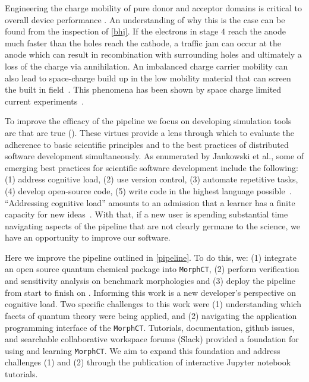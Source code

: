 
Engineering the charge mobility of pure donor and acceptor domains is critical
to overall device performance \cite{Wang2019e}.
An understanding of why this is the case can be found from the inspection of \autoref{bhj}.
If the electrons in stage $4$ reach the anode much faster than the holes reach the cathode, a traffic jam can
occur at the anode which can result in recombination with surrounding holes and ultimately a loss of the
charge via annihilation. 
An imbalanced charge carrier mobility can also lead to space-charge build up in the 
low mobility material that can screen the built in field~\cite{Bartelt2015}.
This phenomena has been shown by space charge limited current experiments~\cite{Small2013}.

To improve the efficacy of the pipeline we focus on
developing simulation tools are that are
\gls{true} (\cite{Cummings2017}).
These virtues provide a lens through which to %
evaluate the adherence to basic scientific principles and to the best practices of distributed software development
simultaneously. As enumerated by Jankowski et al., some of emerging best practices for scientific software
development include the following: (1) address cognitive load, (2) use version control, (3) automate %
repetitive tasks, (4) develop open-source code, (5) write code in the highest language possible~\cite{Jankowski2020}.
``Addressing cognitive load'' amounts to an admission that a learner has a
finite capacity for new ideas~\cite{Jankowski2019}. With that, if a new user is spending
substantial time navigating aspects of the pipeline that are not clearly
germane to the science, we have an opportunity to improve our software.

Here we improve the pipeline outlined in \autoref{pipeline}.
To do this, we: (1) integrate an open source quantum chemical package into \texttt{MorphCT},
(2) perform verification and sensitivity analysis on benchmark 
morphologies and
(3) deploy the pipeline from start to finish on . 
Informing this work is a new developer's perspective on cognitive load. 
Two specific challenges to this work were (1) understanding which facets of quantum
theory were being applied, and (2) navigating the application programming
interface of the \texttt{MorphCT}.
Tutorials, documentation, github issues, and searchable collaborative workspace
forums (Slack) provided a foundation for using and learning \texttt{MorphCT}.
We aim to expand this foundation and address challenges (1) and (2) through
the publication of interactive Jupyter notebook tutorials.

